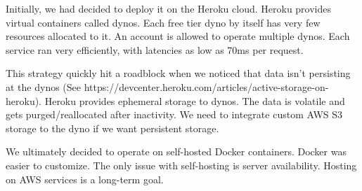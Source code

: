 Initially, we had decided to deploy it on the Heroku cloud. Heroku provides virtual containers called dynos. Each free tier dyno by itself has very few resources allocated to it. An account is allowed to operate multiple dynos. Each service ran very efficiently, 
with latencies as low as 70ms per request.

This strategy quickly hit a roadblock when we noticed that data isn't persisting at the dynos (See https://devcenter.heroku.com/articles/active-storage-on-heroku). 
Heroku provides ephemeral storage to dynos. The data is volatile and gets purged/reallocated after inactivity.
We need to integrate custom AWS S3 storage to the dyno if we want persistent storage. 

We ultimately decided to operate on self-hosted Docker containers. Docker was easier to customize. The only issue with self-hosting is server availability. Hosting on AWS services is a long-term goal.